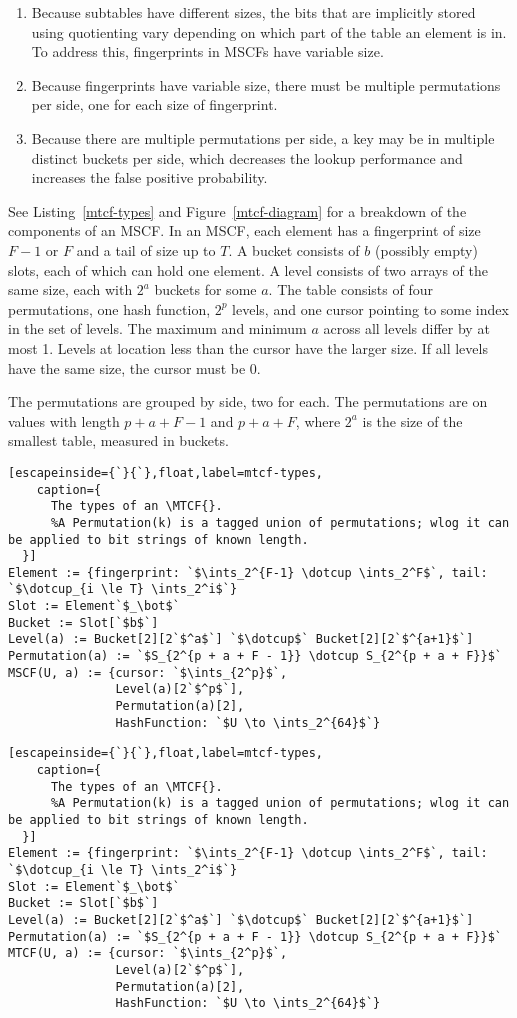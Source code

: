 \documentclass[letterpaper,twocolumn,10pt]{article}
\newcommand{\ints}{\mathbb{Z}}
\newcommand{\dotcup}{\ensuremath{\mathaccent\cdot\cup}}
\newcommand{\MTCF}{MSCF}
\newcommand{\MTCF}{MTCF}
\begin{document}
\begin{enumerate}
  \item Because subtables have different sizes, the bits that are implicitly stored using quotienting vary depending on which part of the table an element is in.
    To address this, fingerprints in \MTCF{}s have variable size.
  \item Because fingerprints have variable size, there must be multiple permutations per side, one for each size of fingerprint.
  \item Because there are multiple permutations per side, a key may be in multiple distinct buckets per side, which decreases the lookup performance and increases the false positive probability.
\end{enumerate}

See Listing~\ref{mtcf-types} and Figure~\ref{mtcf-diagram} for a breakdown of the components of an \MTCF{}.
In an \MTCF{}, each element has a fingerprint of size $F-1$ or $F$ and a tail of size up to $T$.
A bucket consists of $b$ (possibly empty) slots, each of which can hold one element.
A level consists of two arrays of the same size, each with $2^a$ buckets for some $a$.
The table consists of four permutations, one hash function, $2^p$ levels, and one cursor pointing to some index in the set of levels.
The maximum and minimum $a$ across all levels differ by at most 1.
Levels at location less than the cursor have the larger size.
If all levels have the same size, the cursor must be 0.

The permutations are grouped by side, two for each.
The permutations are on values with length $p + a + F - 1$ and $p + a + F$, where $2^a$ is the size of the smallest table, measured in buckets.

\ifanon
\begin{lstlisting}[escapeinside={`}{`},float,label=mtcf-types,
    caption={
      The types of an \MTCF{}.
      %A Permutation(k) is a tagged union of permutations; wlog it can be applied to bit strings of known length.
  }]
Element := {fingerprint: `$\ints_2^{F-1} \dotcup \ints_2^F$`, tail: `$\dotcup_{i \le T} \ints_2^i$`}
Slot := Element`$_\bot$`
Bucket := Slot[`$b$`]
Level(a) := Bucket[2][2`$^a$`] `$\dotcup$` Bucket[2][2`$^{a+1}$`]
Permutation(a) := `$S_{2^{p + a + F - 1}} \dotcup S_{2^{p + a + F}}$`
MSCF(U, a) := {cursor: `$\ints_{2^p}$`,
               Level(a)[2`$^p$`],
               Permutation(a)[2],
               HashFunction: `$U \to \ints_2^{64}$`}
\end{lstlisting}
\else
\begin{lstlisting}[escapeinside={`}{`},float,label=mtcf-types,
    caption={
      The types of an \MTCF{}.
      %A Permutation(k) is a tagged union of permutations; wlog it can be applied to bit strings of known length.
  }]
Element := {fingerprint: `$\ints_2^{F-1} \dotcup \ints_2^F$`, tail: `$\dotcup_{i \le T} \ints_2^i$`}
Slot := Element`$_\bot$`
Bucket := Slot[`$b$`]
Level(a) := Bucket[2][2`$^a$`] `$\dotcup$` Bucket[2][2`$^{a+1}$`]
Permutation(a) := `$S_{2^{p + a + F - 1}} \dotcup S_{2^{p + a + F}}$`
MTCF(U, a) := {cursor: `$\ints_{2^p}$`,
               Level(a)[2`$^p$`],
               Permutation(a)[2],
               HashFunction: `$U \to \ints_2^{64}$`}
\end{lstlisting}
\fi
\end{document}
